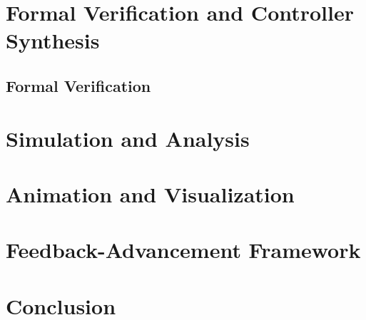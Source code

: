 \documentclass{WileySix}
\begin{document}
\part[Verification and Synthesis]{Formal Verification and Controller Synthesis}

\chapter{Formal Verification}

\part[Simulation and Analysis]{Simulation and Analysis}

\part[Animation and Visualization]{Animation and Visualization}

\part[Feedback-Advancement Framework]{Feedback-Advancement Framework}

\part{Conclusion}



\end{document}
